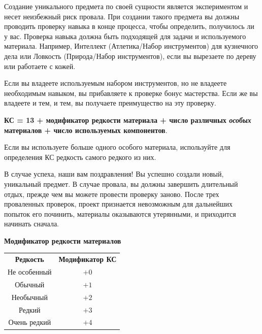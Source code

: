 \documentclass[a4paper, 9pt, twocolumn]{book}
\begin{document}
	Создание уникального предмета по своей сущности является экспериментом и несет неизбежный риск провала. При создании такого предмета вы должны проводить проверку навыка в конце процесса, чтобы определить, получилось ли у вас. Проверка навыка должна быть подходящей для задачи и используемого материала. Например, Интеллект (Атлетика/Набор инструментов) для кузнечного дела или Ловкость (Природа/Набор инструментов), если вы вырезаете по дереву или работаете с кожей.
	
	Если вы владеете используемым набором инструментов, но не владеете необходимым навыком, вы прибавляете к проверке бонус мастерства. Если же вы владеете и тем, и тем, вы получаете преимущество на эту проверку.
	
	\textbf{КС = 13 + модификатор редкости материала + число различных \textit{особых} материалов + число используемых компонентов}.
	
	Если вы используете больше одного особого материала, используйте для определения КС редкость самого редкого из них.
	
	В случае успеха, наши вам поздравления! Вы успешно создали новый, уникальный предмет. В случае провала, вы должны завершить длительный отдых, прежде чем вы можете провести проверку заново. После трех проваленных проверок, проект признается невозможным для дальнейших попыток его починить, материалы оказываются утерянными, и приходится начинать сначала.
	
	\begin{table}[H]
		
		{\Large \textbf{Модификатор редкости материалов}}
		
		\medspace 
		
		\centering 
		
		\begin{tabularx}{\linewidth}{C C}
			
			\textbf{Редкость} & \textbf{Модификатор КС} \\
			
			Не особенный & $+0$ \\
			
			Обычный & $+1$ \\
			
			Необычный & $+2$ \\
			
			Редкий & $+3$ \\
			
			Очень редкий & $+4$ \\
			
		\end{tabularx}
	\end{table}
	
\end{document}
